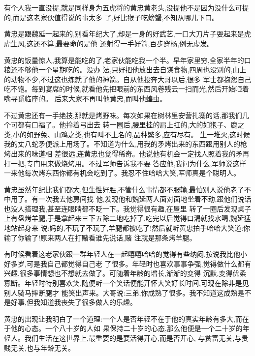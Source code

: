 ﻿\documentclass[12pt,twocolumn]{article}
\begin{document}
\section{}

有个人我一直没提,就是同样身为五虎将的黄忠黄老头,没提他不是因为没什么可提的,而是这老家伙值得说的事太多
了,好比猴子吃螃蟹,不知从哪儿下口。

黄忠是跟魏延一起来的,别看年纪大了,却是一身的好武艺,一口大刀片子耍起来是虎虎生风,这还不算,最要命的是他
还射得一手好箭,百步穿杨,例无虚发。

黄忠的饭量惊人,我算是能吃的了,老家伙能吃我一个半。早年家里穷,全家半年的口粮还不够他一个星期吃的。没办
法,只好把他放出去自谋食物,四周也没别的,山上的动物不少,不过这也练就了他的神箭。自从他投奔大哥以后,很多
军士都抱怨自己吃不饱。每到宴席的时候,就看他先把眼前的东西风卷残云一扫而光,然后开始咂着嘴寻觅临座的。
后来大家不再叫他黄忠,而叫他蝗虫。

不过黄忠还有一手绝技,那就是烤野味。每次如果在树林里安营扎寨的话,那我们几个可都有口福了。他拎着弓出去
转一圈后,腰里挂的肩上扛的,大的如狍子、鹿之类,小的如野兔、山鸡之类,也有叫不上名的,品种繁多,应有尽有。
生一堆火,这时候我的丈八蛇矛便派上用场了。不知道为什么,用我的矛烤出来的东西跟用别人的枪烤出来的味道相
差很远,连黄忠也觉得稀奇。他说他有机会一定找人照着我的矛再打一把,专门用来做烧烤用。不过军师告诉我不要
答应他,我问为什么,军师说这样一来他每次烤东西你都有机会吃到了。我忍不住哈哈大笑,军师真是个聪明人。

黄忠虽然年纪比我们都大,但生性好胜,不管什么事情都不服输,最怕别人说他老了不中用了。有一次我去他房间找
他,发现他和魏延两人面对面地坐着不动,跟他们说话也没人搭理我,甚至连眼睛都不眨一下。我觉得很有趣,在屋里
转了一圈后发现桌子上有盘烤羊腿,于是拿起来三下五除二地吃掉了,吃完以后觉得口渴就找水喝,魏延猛地站起身来
说:妈的,不玩了不玩了,羊腿都被吃了!然后就听黄忠拍手哈哈大笑道:你输了你输了!原来两人在打赌看谁先说话,赌
注就是那条烤羊腿。

有时候看着这老家伙跟一群年轻人在一起嘻嘻哈哈的觉得有些纳闷,按说我比他小好多岁,可是我自己都觉得自己老
了很多。年轻时也喜欢事事争强,觉得做什么都有兴趣,很多事情想也不想就去做了。可随着年龄的增长,渐渐的变得
沉默,变得优柔寡断。年轻时特别喜欢笑,随便听一个笑话便能开怀大笑好长时间,可现在除非是见别人骑马摔断腿才
能笑出声来。大哥说:三弟,你成熟了很多。我不知道这成熟是不是好事,但我知道我丧失了很多做人的乐趣。

黄忠的出现让我明白了一个道理:一个人是否年轻不在于他的真实年龄有多大,而在于他的心态。一个八十岁的人如
果保持二十岁的心态,那么他便是一个二十岁的年轻人。我们生活在这世界上,最重要的是要活得开心,而是否开心,
与贫富无关,与贵贱无关,也与年龄无关。
\end{document}
